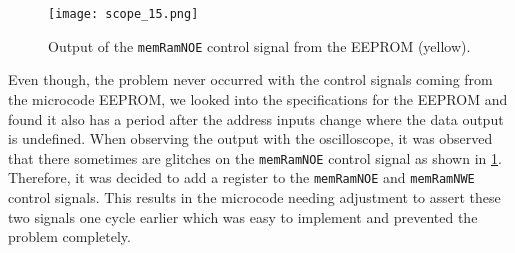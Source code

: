 \begin{figure}[t]
  \texttt{[image: scope\_15.png]}
  \caption{Output of the \texttt{memRamNOE} control signal from the \gls{EEPROM} (yellow).}
  \label{fig:EEPROMGlitch}
\end{figure}
Even though, the problem never occurred with the control signals coming from the microcode \gls{EEPROM}, we looked into the specifications for the \gls{EEPROM} and found it also has a period after the address inputs change where the data output is undefined.
When observing the output with the oscilloscope, it was observed that there sometimes are glitches on the \texttt{memRamNOE} control signal as shown in \cref{fig:EEPROMGlitch}.
Therefore, it was decided to add a register to the \texttt{memRamNOE} and \texttt{memRamNWE} control signals.
This results in the microcode needing adjustment to assert these two signals one cycle earlier which was easy to implement and prevented the problem completely.